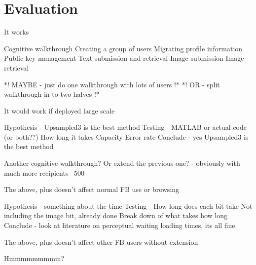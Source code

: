 \chapter{Evaluation}\label{ch:evaluation}

It works

	Cognitive walkthrough 
		Creating a group of users
		Migrating profile information
		Public key management
		Text submission and retrieval
		Image submission
		Image retrieval

	*! MAYBE - just do one walkthrough with lots of users !*
	*! OR - split walkthrough in to two halves !*


It would work if deployed large scale
	
	Hypothesis - Upsampled3 is the best method
	Testing -	MATLAB or actual code (or both??) 	
			How long it takes
			Capacity
			Error rate
	Conclude - yes Upsampled3 is the best method

	Another cognitive walkthrough? Or extend the previous one?
		- obviously with much more recipients ~500


The above, plus doesn't affect normal FB use or browsing

	Hypothesis - something about the time
	Testing -	How long does each bit take
			Not including the image bit, already done
			Break down of what takes how long
	Conclude - look at literature on perceptual waiting loading times, its all fine.

The above, plus doesn't affect other FB users without extension


	Hmmmmmmmmm?